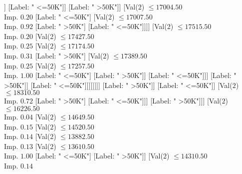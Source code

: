 \documentclass[margin=10pt]{standalone}
\begin{document}
\begin{forest}
																															[Val($2$) $ \leq 15919.50$ \\ Imp. $0.12$
																																[Val($2$) $ \leq 15824.50$ \\ Imp. $0.20$
																																	[Label: " <=50K"]
																																	[Label: " >50K"]]
																																[Label: " <=50K"]]
																															[Label: " >50K"]]
																														[Val($2$) $ \leq 17004.50$ \\ Imp. $0.20$
																															[Label: " <=50K"]
																															[Val($2$) $ \leq 17007.50$ \\ Imp. $0.92$
																																[Label: " >50K"]
																																[Label: " <=50K"]]]]
																													[Val($2$) $ \leq 17515.50$ \\ Imp. $0.20$
																														[Val($2$) $ \leq 17427.50$ \\ Imp. $0.25$
																															[Val($2$) $ \leq 17174.50$ \\ Imp. $0.31$
																																[Label: " >50K"]
																																[Val($2$) $ \leq 17389.50$ \\ Imp. $0.25$
																																	[Val($2$) $ \leq 17257.50$ \\ Imp. $1.00$
																																		[Label: " <=50K"]
																																		[Label: " >50K"]]
																																	[Label: " <=50K"]]]
																															[Label: " >50K"]]
																														[Label: " <=50K"]]]]]]]]
																							[Label: " >50K"]]
																						[Label: " <=50K"]]
																					[Val($2$) $ \leq 18310.50$ \\ Imp. $0.72$
																						[Label: " >50K"]
																						[Label: " <=50K"]]]
																				[Label: " >50K"]]]
																		[Val($2$) $ \leq 16226.50$ \\ Imp. $0.04$
																			[Val($2$) $ \leq 14649.50$ \\ Imp. $0.15$
																				[Val($2$) $ \leq 14520.50$ \\ Imp. $0.14$
																					[Val($2$) $ \leq 13882.50$ \\ Imp. $0.13$
																						[Val($2$) $ \leq 13610.50$ \\ Imp. $1.00$
																							[Label: " <=50K"]
																							[Label: " >50K"]]
																						[Val($2$) $ \leq 14310.50$ \\ Imp. $0.14$

\end{forest}
\end{document}
